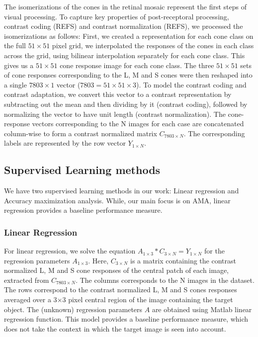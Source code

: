 \documentclass{jov}
\begin{document}
The isomerizations of the cones in the retinal mosaic represent the first steps of visual processing.  To capture key properties of post-receptoral processing, contrast coding (REFS) and contrast normalization (REFS),
we processed the isomerizations as follows:
First, we created a representation for each cone class on the full $51 \times 51$ pixel grid, we interpolated the responses of the cones in each class across the grid, using bilinear interpolation separately for each cone class.
This gives us a $51 \times 51$ cone response image for each cone class.
The three $51 \times 51$ sets of cone responses corresponding to the L, M and S cones were then reshaped into a single $7803 \times 1$ vector ($7803 = 51 \times 51 \times 3$). To model the contrast coding and contrast adaptation, we convert this vector to a contrast representation by subtracting out the mean and then dividing by it (contrast coding), followed by normalizing the vector to have unit length (contrast normalization).
The cone-response vectors corresponding to the N images for each case are concatenated column-wise to form a contrast normalized matrix $C_{7803\times N}$. The corresponding labels are represented by the row vector $Y_{1\times N}$.

\subsection{Supervised Learning methods} \label{method:SupervisedLearning}
We have two supervised learning methods in our work: Linear regression and Accuracy maximization analysis. While, our main focus is on AMA, linear regression provides a baseline performance measure.

\subsubsection*{Linear Regression} For linear regression, we solve the equation $A_{1\times3}*C_{3\times N} = Y_{1\times N}$ for the regression parameters $A_{1\times3}$. Here, $C_{3\times N}$ is a matrix containing the contrast normalized L, M and S cone responses of the central patch of each image, extracted from $C_{7803\times N}$.  The columns corresponds to the N images in the dataset. The rows correspond to the contrast normalized L, M and S cones responses averaged over a 3$\times$3 pixel central region of the image containing the target object.  The (unknown) regression parameters $A$ are obtained using Matlab linear regression function. This model provides a baseline performance measure, which does not take the context in which the target image is seen into account.
\end{document}
